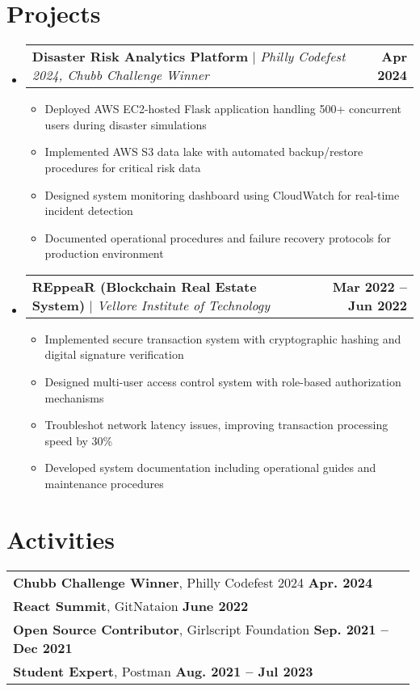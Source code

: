 \documentclass[letterpaper,11pt]{article}
\makeatletter
\newcommand{\resumeItem}[1]{
  \item\small{
    {#1 \vspace{-2pt}}
  }
}
\newcommand{\resumeProjectHeading}[2]{
    \item
    \begin{tabular*}{1.001\textwidth}{l@{\extracolsep{\fill}}r}
      \small#1 & \textbf{\small #2}\\
    \end{tabular*}\vspace{-3pt}
}
\newcommand{\resumeSubHeadingListStart}{\begin{itemize}[leftmargin=0.0in, label={}]}
\newcommand{\resumeSubHeadingListEnd}{\end{itemize}}
\newcommand{\resumeItemListStart}{\begin{itemize}}
\newcommand{\resumeItemListEnd}{\end{itemize}\vspace{-5pt}}
\makeatother
\begin{document}
\section{Projects}
\vspace{-5pt}
\resumeSubHeadingListStart
    \resumeProjectHeading
    {\textbf{Disaster Risk Analytics Platform} $|$ \emph{Philly Codefest 2024, Chubb Challenge Winner}} {Apr 2024}
    \resumeItemListStart
        \resumeItem{Deployed AWS EC2-hosted Flask application handling 500+ concurrent users during disaster simulations}
        \resumeItem{Implemented AWS S3 data lake with automated backup/restore procedures for critical risk data}
        \resumeItem{Designed system monitoring dashboard using CloudWatch for real-time incident detection}
        \resumeItem{Documented operational procedures and failure recovery protocols for production environment}
    \resumeItemListEnd
    \vspace{-15pt}
    \resumeProjectHeading
    {\textbf{REppeaR (Blockchain Real Estate System)} $|$ \emph{Vellore Institute of Technology}} {Mar 2022 -- Jun 2022}
    \resumeItemListStart
        \resumeItem{Implemented secure transaction system with cryptographic hashing and digital signature verification}
        \resumeItem{Designed multi-user access control system with role-based authorization mechanisms}
        \resumeItem{Troubleshot network latency issues, improving transaction processing speed by 30\%}
        \resumeItem{Developed system documentation including operational guides and maintenance procedures}
    \resumeItemListEnd

\resumeSubHeadingListEnd

\section{Activities}
\begin{tabular}{p{0.99\linewidth}}
    \hspace{0.15in}\textbf{Chubb Challenge Winner}, Philly Codefest 2024
        \hfill \textbf{Apr. 2024} \\
            \hspace{0.15in}\textbf{React Summit}, GitNataion
        \hfill \textbf{June 2022}\\
    \hspace{0.15in}\textbf{Open Source Contributor}, Girlscript Foundation
        \hfill \textbf{Sep. 2021 -- Dec 2021}\\

    \hspace{0.15in}\textbf{Student Expert}, Postman
        \hfill \textbf{Aug. 2021 -- Jul 2023} 
    
\end{tabular}
\vspace{-25pt}
\end{document}
